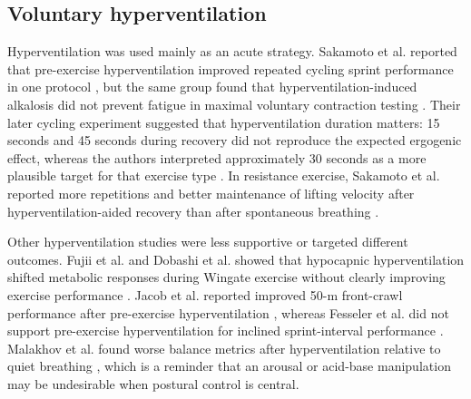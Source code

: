 \documentclass[12pt,a4paper]{article}
\begin{document}
\subsection{Voluntary hyperventilation}
Hyperventilation was used mainly as an acute strategy. Sakamoto et al. reported that pre-exercise hyperventilation improved repeated cycling sprint performance in one protocol \parencite{sakamoto_a_and_naito_h_and_chow_cm_hyperventilation_2014}, but the same group found that hyperventilation-induced alkalosis did not prevent fatigue in maximal voluntary contraction testing \parencite{sakamoto_a_and_naito_h_and_chow_cm_hyperventilation-induced_2015}. Their later cycling experiment suggested that hyperventilation duration matters: 15 seconds and 45 seconds during recovery did not reproduce the expected ergogenic effect, whereas the authors interpreted approximately 30 seconds as a more plausible target for that exercise type \parencite{sakamoto_a_and_naito_h_and_chow_cm_effects_2018}. In resistance exercise, Sakamoto et al. reported more repetitions and better maintenance of lifting velocity after hyperventilation-aided recovery than after spontaneous breathing \parencite{sakamoto_hyperventilation-aided_2020}.

Other hyperventilation studies were less supportive or targeted different outcomes. Fujii et al. and Dobashi et al. showed that hypocapnic hyperventilation shifted metabolic responses during Wingate exercise without clearly improving exercise performance \parencite{fujii_effect_2015,dobashi_voluntary_2021}. Jacob et al. reported improved 50-m front-crawl performance after pre-exercise hyperventilation \parencite{jacob_pre-exercise_2015}, whereas Fesseler et al. did not support pre-exercise hyperventilation for inclined sprint-interval performance \parencite{fesseler_l_and_patzak_a_and_heinz_v_and_le_ns_and_opatz_o_and_pilz_n_and_bothe_tl_effect_2026}. Malakhov et al. found worse balance metrics after hyperventilation relative to quiet breathing \parencite{malakhov_m_and_makarenkova_e_and_melnikov_a_influence_2014}, which is a reminder that an arousal or acid-base manipulation may be undesirable when postural control is central.
\end{document}
